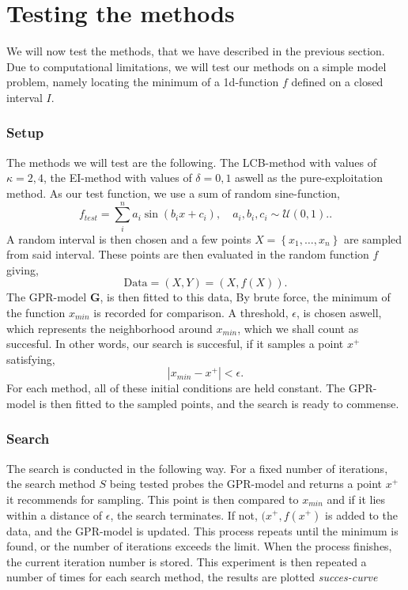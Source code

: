 \documentclass[working, oneside]{../../../Preambles/tuftebook}
\begin{document}
\let\cleardoublepage\clearpage
\thispagestyle{fancy}
\chapter{Testing the methods}
We will now test the methods, that we have described in the previous section. Due to computational limitations, we will test our methods on a simple model problem, namely locating the minimum of a 1d-function $f$ defined on a closed interval $I$. 
\subsection{Setup}
The methods we will test are the following. The LCB-method with values of $\kappa = 2, 4$, the EI-method with values of $\delta = 0, 1$ aswell as the pure-exploitation method. As our test function, we use a sum of random sine-function,
\[
f_{test} = \sum_i^{n} a_i \sin(b_i x + c_i), \quad a_i, b_i, c_i \sim \mathcal{U}(0, 1).
.\] 
A random interval is then chosen and a few points $X = \left\{   x_1, \ldots, x_{n}\right\}$ are sampled from said interval. These points are then evaluated in the random function $f$ giving,
\[
\text{Data} = \left( X, Y \right) = \left( X, f\left( X \right)  \right) 
.\] 
The GPR-model $\bm{G}$, is then fitted to this data, 
By brute force, the minimum of the function $x_{min}$ is recorded for comparison. A threshold, $\epsilon$, is chosen aswell, which represents the neighborhood around $x_{min}$, which we shall count as succesful. In other words, our search is succesful, if it samples a point $x^{+}$ satisfying,
\[
\left| x_{min} - x^{+} \right| < \epsilon
.\]
For each method, all of these initial conditions are held constant. The GPR-model is then fitted to the sampled points, and the search is ready to commense.
\subsection{Search}
The search is conducted in the following way. For a fixed number of iterations, the search method $S$ being tested probes the GPR-model and returns a point $x^{+}$ it recommends for sampling. This point is then compared to $x_{min}$ and if it lies within a distance of $\epsilon$, the search terminates. If not, $(x^{+}, f(x^{+})$ is added to the data, and the GPR-model is updated. This process repeats until the minimum is found, or the number of iterations exceeds the limit. When the process finishes, the current iteration number is stored. 
This experiment is then repeated a number of times for each search method, the results are plotted \textit{succes-curve}
\end{document}
